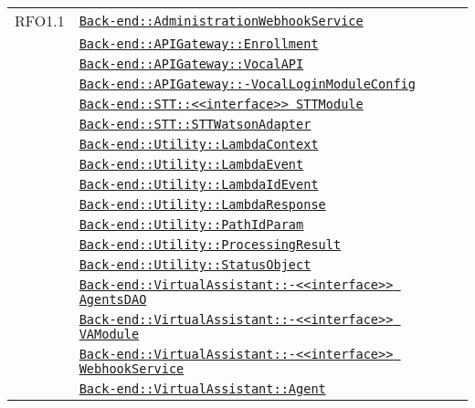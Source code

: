 \begin{longtable}{|>{\centering}m{3cm}|m{10cm}<{\centering}|}
RFO1.1 & \hyperref[Back-end::AdministrationWebhookService]{\texttt{Back-end::AdministrationWebhookService}}\\
& \hyperref[Back-end::APIGateway::Enrollment]{\texttt{Back-end::APIGateway::Enrollment}}\\
& \hyperref[Back-end::APIGateway::VocalAPI]{\texttt{Back-end::APIGateway::VocalAPI}}\\
& \hyperref[Back-end::APIGateway::VocalLoginModuleConfig]{\texttt{Back-end::APIGateway::-\linebreak VocalLoginModuleConfig}}\\
& \hyperref[Back-end::STT::<<interface>> STTModule]{\texttt{Back-end::STT::<<interface>> STTModule}}\\
& \hyperref[Back-end::STT::STTWatsonAdapter]{\texttt{Back-end::STT::STTWatsonAdapter}}\\
& \hyperref[Back-end::Utility::LambdaContext]{\texttt{Back-end::Utility::LambdaContext}}\\
& \hyperref[Back-end::Utility::LambdaEvent]{\texttt{Back-end::Utility::LambdaEvent}}\\
& \hyperref[Back-end::Utility::LambdaIdEvent]{\texttt{Back-end::Utility::LambdaIdEvent}}\\
& \hyperref[Back-end::Utility::LambdaResponse]{\texttt{Back-end::Utility::LambdaResponse}}\\
& \hyperref[Back-end::Utility::PathIdParam]{\texttt{Back-end::Utility::PathIdParam}}\\
& \hyperref[Back-end::Utility::ProcessingResult]{\texttt{Back-end::Utility::ProcessingResult}}\\
& \hyperref[Back-end::Utility::StatusObject]{\texttt{Back-end::Utility::StatusObject}}\\
& \hyperref[Back-end::VirtualAssistant::<<interface>> AgentsDAO]{\texttt{Back-end::VirtualAssistant::-\linebreak <<interface>> AgentsDAO}}\\
& \hyperref[Back-end::VirtualAssistant::<<interface>> VAModule]{\texttt{Back-end::VirtualAssistant::-\linebreak <<interface>> VAModule}}\\
& \hyperref[Back-end::VirtualAssistant::<<interface>> WebhookService]{\texttt{Back-end::VirtualAssistant::-\linebreak <<interface>> WebhookService}}\\
& \hyperref[Back-end::VirtualAssistant::Agent]{\texttt{Back-end::VirtualAssistant::Agent}}\\

\end{longtable}
